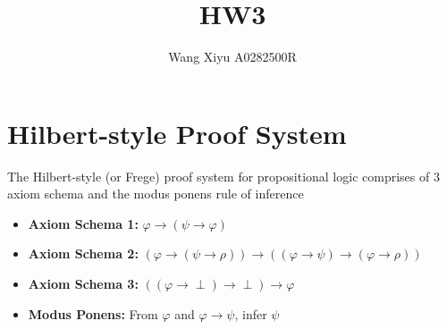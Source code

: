 \documentclass{article}
\begin{document}
\title{HW3}
\author{Wang Xiyu A0282500R}
\date{}
\maketitle
\newpage
\section*{Hilbert-style Proof System}
The Hilbert-style (or Frege) proof system for propositional logic comprises of 3 axiom schema and the modus ponens rule of inference

\begin{itemize}
    \item \textbf{Axiom Schema 1:} $\varphi \rightarrow (\psi \rightarrow \varphi)$ 
    \item \textbf{Axiom Schema 2:} $(\varphi \rightarrow (\psi \rightarrow \rho)) \rightarrow ((\varphi \rightarrow \psi) \rightarrow (\varphi \rightarrow \rho))$ 
    \item \textbf{Axiom Schema 3:} $((\varphi \rightarrow \perp) \rightarrow \perp) \rightarrow \varphi$
    \item \textbf{Modus Ponens:} From $\varphi$ and $\varphi \rightarrow \psi$, infer $\psi$
\end{itemize}
\end{document}
